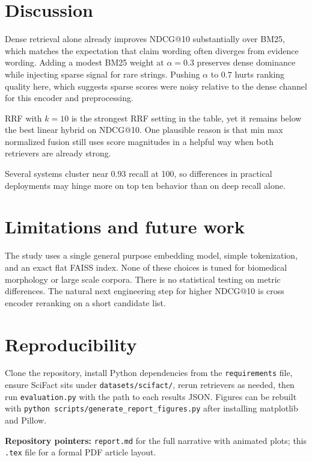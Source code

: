 \documentclass[11pt,a4paper]{article}
\begin{document}
\section{Discussion}

Dense retrieval alone already improves NDCG@10 substantially over BM25, which matches the expectation that claim wording often diverges from evidence wording. Adding a modest BM25 weight at $\alpha = 0.3$ preserves dense dominance while injecting sparse signal for rare strings. Pushing $\alpha$ to $0.7$ hurts ranking quality here, which suggests sparse scores were noisy relative to the dense channel for this encoder and preprocessing.

RRF with $k=10$ is the strongest RRF setting in the table, yet it remains below the best linear hybrid on NDCG@10. One plausible reason is that min max normalized fusion still uses score magnitudes in a helpful way when both retrievers are already strong.

Several systems cluster near $0.93$ recall at 100, so differences in practical deployments may hinge more on top ten behavior than on deep recall alone.

\section{Limitations and future work}

The study uses a single general purpose embedding model, simple tokenization, and an exact flat FAISS index. None of these choices is tuned for biomedical morphology or large scale corpora. There is no statistical testing on metric differences. The natural next engineering step for higher NDCG@10 is cross encoder reranking on a short candidate list.

\section{Reproducibility}

Clone the repository, install Python dependencies from the \texttt{requirements} file, ensure SciFact sits under \texttt{datasets/scifact/}, rerun retrievers as needed, then run \texttt{evaluation.py} with the path to each results JSON. Figures can be rebuilt with \texttt{python scripts/generate\_report\_figures.py} after installing matplotlib and Pillow.

\vspace{1em}
\noindent\textbf{Repository pointers:} \texttt{report.md} for the full narrative with animated plots; this \texttt{.tex} file for a formal PDF article layout.
\end{document}
